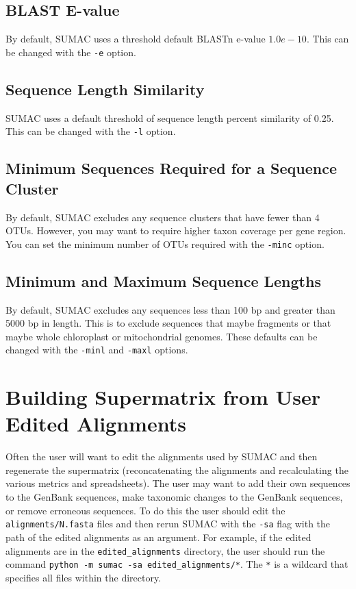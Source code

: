 \documentclass[10pt]{report}
\begin{document}
\subsection{BLAST E-value}
By default, SUMAC uses a threshold default BLASTn e-value $1.0e-10$.
This can be changed with the \verb|-e| option.

\subsection{Sequence Length Similarity}
SUMAC uses a default threshold of sequence length percent similarity
of 0.25. This can be changed with the \verb|-l| option.

\subsection{Minimum Sequences Required for a Sequence Cluster}
By default, SUMAC excludes any sequence clusters that
have fewer than 4 OTUs. However, you may want to require
higher taxon coverage per gene region. You can set
the minimum number of OTUs required with the \verb|-minc| option.

\subsection{Minimum and Maximum Sequence Lengths}
By default, SUMAC excludes any sequences less than 100 bp and greater
than 5000 bp in length. This is to exclude sequences that maybe fragments
or that maybe whole chloroplast or mitochondrial genomes.
These defaults can be changed with the \verb|-minl| and \verb|-maxl| options.

\section{Building Supermatrix from User Edited Alignments}
Often the user will want to edit the alignments used by SUMAC
and then regenerate the supermatrix (reconcatenating the alignments and
recalculating the various metrics and spreadsheets). The user may want to add their own
sequences to the GenBank sequences, make taxonomic changes to the GenBank sequences, or remove erroneous
sequences. To do this the user should edit the \texttt{alignments/N.fasta}
files and then rerun SUMAC with the \texttt{-sa} flag with the path
of the edited alignments as an argument. For example, if the edited
alignments are in the \texttt{edited\_alignments} directory, the user
should run the command \texttt{python -m sumac -sa edited\_alignments/*}. 
The \texttt{*} is a wildcard that specifies all files within the directory.
\end{document}
